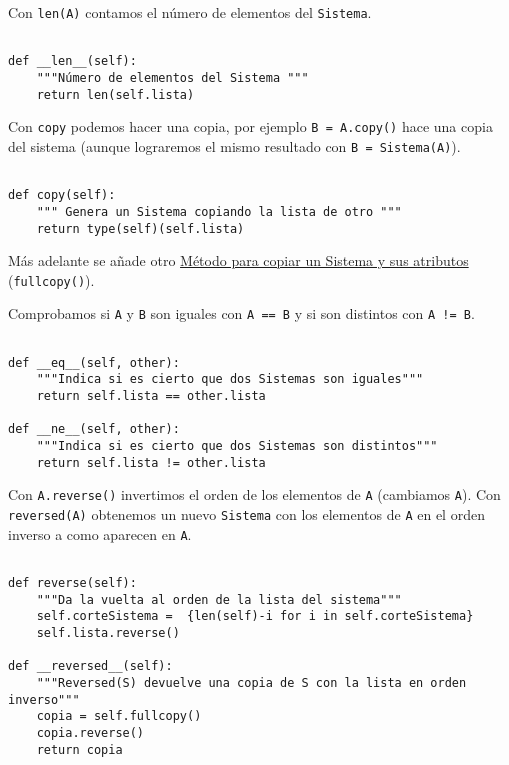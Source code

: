 \documentclass[11pt]{report}
\begin{document}
Con \texttt{len(A)} contamos el número de elementos del \texttt{Sistema}. 

\begin{verbatim}

def __len__(self):
    """Número de elementos del Sistema """
    return len(self.lista)

\end{verbatim}

Con \texttt{copy} podemos hacer una copia, por ejemplo \texttt{B = A.copy()} hace
una copia del sistema  (aunque lograremos el mismo resultado con
\texttt{B = Sistema(A)}).

\begin{verbatim}

def copy(self):
    """ Genera un Sistema copiando la lista de otro """
    return type(self)(self.lista)

\end{verbatim}

Más adelante se añade otro \hyperref[sec:orgc481f27]{Método para copiar un Sistema y sus atributos} (\texttt{fullcopy()}).

Comprobamos si \texttt{A} y \texttt{B} son iguales con \texttt{A == B} y si son distintos con
\texttt{A != B}.

\begin{verbatim}

def __eq__(self, other):
    """Indica si es cierto que dos Sistemas son iguales"""
    return self.lista == other.lista

def __ne__(self, other):
    """Indica si es cierto que dos Sistemas son distintos"""
    return self.lista != other.lista

\end{verbatim}

Con \texttt{A.reverse()} invertimos el orden de los elementos de \texttt{A}
(cambiamos \texttt{A}). Con \texttt{reversed(A)} obtenemos un nuevo \texttt{Sistema} con
los elementos de \texttt{A} en el orden inverso a como aparecen en \texttt{A}.

\begin{verbatim}

def reverse(self):
    """Da la vuelta al orden de la lista del sistema"""
    self.corteSistema =  {len(self)-i for i in self.corteSistema}
    self.lista.reverse()
    
def __reversed__(self):
    """Reversed(S) devuelve una copia de S con la lista en orden inverso"""
    copia = self.fullcopy()
    copia.reverse()
    return copia
    
\end{verbatim}
\end{document}

